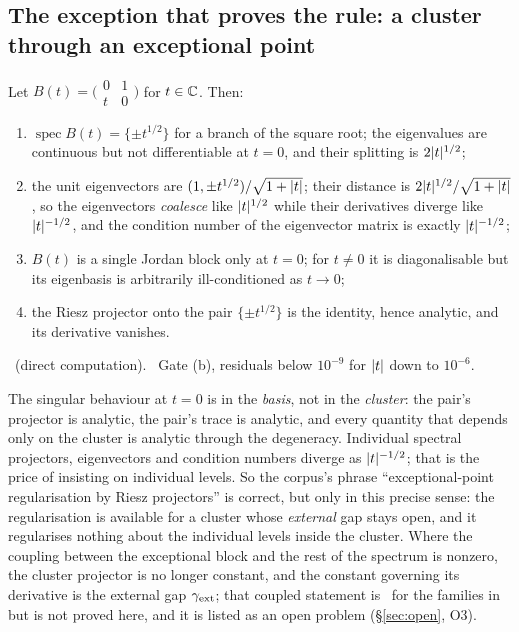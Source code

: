 \subsection{The exception that proves the rule: a cluster through an exceptional point}

\begin{theorem}\label{thm:ep}
Let $B(t)=\bigl(\begin{smallmatrix}0&1\\t&0\end{smallmatrix}\bigr)$ for $t\in\mathbb{C}$. Then:
\begin{enumerate}[label=(\roman*)]
\item $\operatorname{spec}B(t)=\{\pm t^{1/2}\}$ for a branch of the square root; the eigenvalues
are continuous but not differentiable at $t=0$, and their splitting is $2\lvert t\rvert^{1/2}$;
\item the unit eigenvectors are $(1,\pm t^{1/2})/\sqrt{1+\lvert t\rvert}$; their distance is
$2\lvert t\rvert^{1/2}/\sqrt{1+\lvert t\rvert}$, so the eigenvectors \emph{coalesce} like $\lvert t\rvert^{1/2}$ while
their derivatives diverge like $\lvert t\rvert^{-1/2}$, and the condition number of the eigenvector
matrix is exactly $\lvert t\rvert^{-1/2}$;
\item $B(t)$ is a single Jordan block only at $t=0$; for $t\neq0$ it is diagonalisable but its
eigenbasis is arbitrarily ill-conditioned as $t\to0$;
\item the Riesz projector onto the pair $\{\pm t^{1/2}\}$ is the identity, hence analytic, and
its derivative vanishes.
\end{enumerate}
\T\ (direct computation). \V\ Gate  (b), residuals below $10^{-9}$ for
$\lvert t\rvert$ down to $10^{-6}$.
\end{theorem}

\begin{remark}
\label{rem:ep-scope}
The singular behaviour at $t=0$ is in the \emph{basis}, not in the \emph{cluster}: the pair's
projector is analytic, the pair's trace is analytic, and every quantity that depends only on the
cluster is analytic through the degeneracy. Individual spectral projectors, eigenvectors and
condition numbers diverge as $\lvert t\rvert^{-1/2}$; that is the price of insisting on individual
levels. So the corpus's phrase ``exceptional-point regularisation by Riesz projectors'' is
correct, but only in this precise sense: the regularisation is available for a cluster whose
\emph{external} gap stays open, and it regularises nothing about the individual levels inside
the cluster. Where the coupling between the exceptional block and the rest of the spectrum is
nonzero, the cluster projector is no longer constant, and the constant governing its derivative
is the external gap $\gamma_{\mathrm{ext}}$; that coupled statement is \V\ for the families in
 but is not proved here, and it is listed as an open problem
(\S\ref{sec:open}, O3).
\end{remark}

